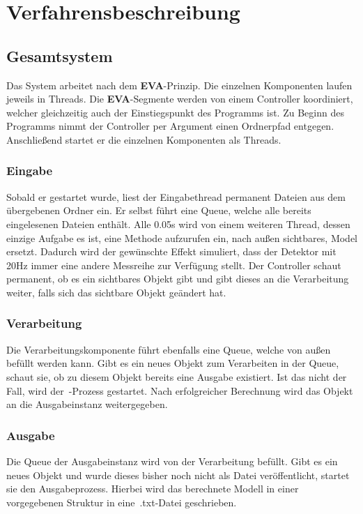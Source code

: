 \chapter{Verfahrensbeschreibung}\label{ch:verfahrensbeschreibung}


\section{Gesamtsystem}\label{sec:gesamtsystem}
Das System arbeitet nach dem \textbf{EVA}-Prinzip.
Die einzelnen Komponenten laufen jeweils in Threads.
Die \textbf{EVA}-Segmente werden von einem Controller koordiniert, welcher gleichzeitig auch der Einstiegspunkt des Programms ist.
Zu Beginn des Programms nimmt der Controller per Argument einen Ordnerpfad entgegen.
Anschließend startet er die einzelnen Komponenten als Threads.

\subsection{Eingabe}\label{subsec:eingabe}
Sobald er gestartet wurde, liest der Eingabethread permanent Dateien aus dem übergebenen Ordner ein.
Er selbst führt eine Queue, welche alle bereits eingelesenen Dateien enthält.
Alle 0.05s wird von einem weiteren Thread, dessen einzige Aufgabe es ist, eine Methode aufzurufen ein, nach außen sichtbares, Model ersetzt.
Dadurch wird der gewünschte Effekt simuliert, dass der Detektor mit 20Hz immer eine andere Messreihe zur Verfügung stellt.
Der Controller schaut permanent, ob es ein sichtbares Objekt gibt und gibt dieses an die Verarbeitung weiter, falls sich das sichtbare Objekt geändert hat.

\subsection{Verarbeitung}\label{subsec:verarbeitung}
Die Verarbeitungskomponente führt ebenfalls eine Queue, welche von außen befüllt werden kann.
Gibt es ein neues Objekt zum Verarbeiten in der Queue, schaut sie, ob zu diesem Objekt bereits eine Ausgabe existiert.
Ist das nicht der Fall, wird der~-Prozess gestartet.
Nach erfolgreicher Berechnung wird das Objekt an die Ausgabeinstanz weitergegeben.

\subsection{Ausgabe}\label{subsec:ausgabe}
Die Queue der Ausgabeinstanz wird von der Verarbeitung befüllt.
Gibt es ein neues Objekt und wurde dieses bisher noch nicht als Datei veröffentlicht, startet sie den Ausgabeprozess.
Hierbei wird das berechnete Modell in einer vorgegebenen Struktur in eine~.txt-Datei geschrieben.


